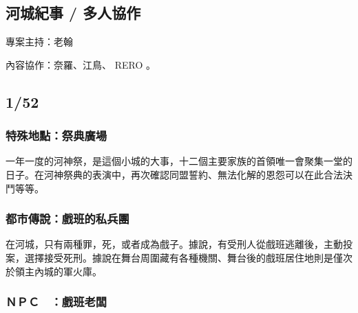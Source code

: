 \documentclass[10pt, a5paper]{article}
\begin{document}
\begin{CJK}{UTF8}{bsmi}
\pagebreak %



\thispagestyle{empty} %

\tableofcontents %

\vfill %
\contactmethod

\pagebreak %







\setcounter{page}{1} %

\section{河城紀事 / 多人協作}

\noindent 專案主持：老翰

\noindent 內容協作：奈羅、江鳥、 RERO 。

\subsection{1/52}

\subsubsection{特殊地點：祭典廣場}

一年一度的河神祭，是這個小城的大事，十二個主要家族的首領唯一會聚集一堂的日子。在河神祭典的表演中，再次確認同盟誓約、無法化解的恩怨可以在此合法決鬥等等。

\subsubsection{都市傳說：戲班的私兵團}

在河城，只有兩種罪，死，或者成為戲子。據說，有受刑人從戲班逃離後，主動投案，選擇接受死刑。據說在舞台周圍藏有各種機關、舞台後的戲班居住地則是僅次於領主內城的軍火庫。

\subsubsection{ＮＰＣ　：戲班老闆}


\end{CJK}
\end{document}
